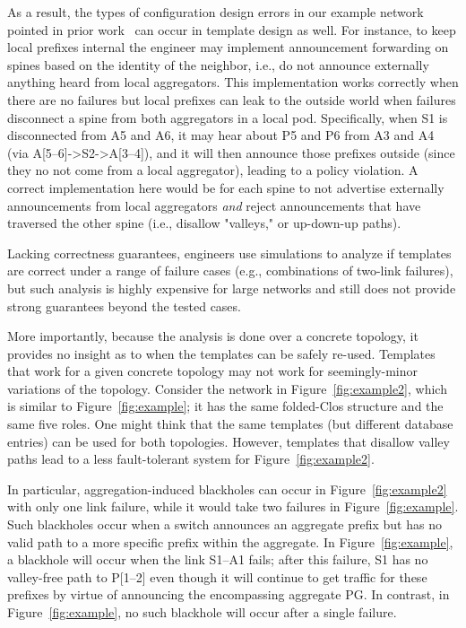 \documentclass{sig-alternate-10pt}
\begin{document}
As a result, the types of configuration design errors in our example network pointed in prior work~\cite{propane} can occur in template design as well. For instance, to keep local prefixes internal the engineer may implement announcement forwarding on spines based on the identity of the neighbor, i.e., do not announce externally anything heard from local aggregators. This implementation works correctly when there are no failures but local prefixes can leak to the outside world when failures disconnect a spine from both aggregators in a local pod. Specifically, when S1 is disconnected from A5 and A6, it may hear about P5 and P6 from A3 and A4 (via A[5--6]->S2->A[3--4]), and it will then announce those prefixes outside (since they no not come from a local aggregator), leading to a policy violation. A correct implementation here would be for each spine to not advertise externally announcements from local aggregators {\em and} reject announcements that have traversed the other spine (i.e., disallow "valleys," or up-down-up paths).

Lacking correctness guarantees, engineers use simulations to analyze if templates are correct under a range of failure cases (e.g., combinations of two-link failures), but such analysis is highly expensive for large networks and still does not provide strong guarantees beyond the tested cases.

More importantly, because the analysis is done over a concrete topology, it provides no insight as to when the templates can be safely re-used. Templates that work for a given concrete topology may not work for seemingly-minor variations of the topology. Consider the network in Figure~\ref{fig:example2}, which is similar to Figure~\ref{fig:example}; it has the same folded-Clos structure and the same five roles. One might think that the same templates (but different database entries) can be used for both topologies. However, templates that disallow valley paths lead to a less fault-tolerant system for Figure~\ref{fig:example2}. 

In particular, aggregation-induced blackholes can occur in Figure~\ref{fig:example2} with only one link failure, while it would take two failures in Figure~\ref{fig:example}. Such blackholes occur when a switch announces an aggregate prefix but has no valid path to a more specific prefix within the aggregate. In Figure~\ref{fig:example}, a blackhole will occur when the link S1--A1 fails; after this failure, S1 has no valley-free path to P[1--2] even though it will continue to get traffic for these prefixes by virtue of announcing the encompassing aggregate PG. In contrast, in Figure~\ref{fig:example}, no such blackhole will occur after a single failure. 
\end{document}
